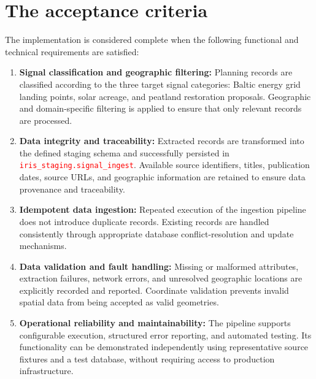 \documentclass[11pt,a4paper]{article}
\begin{document}
\section{The acceptance criteria}\label{sec:criteria}
%
The implementation is considered complete when the following
functional and technical requirements are satisfied:

\begin{enumerate}
	
	\item \textbf{Signal classification and geographic filtering:} 
	Planning records are classified according to the three target
	signal categories: Baltic energy grid landing points, solar
	acreage, and peatland restoration proposals. Geographic and
	domain-specific filtering is applied to ensure that only
	relevant records are processed.
	
	\item \textbf{Data integrity and traceability:} 
	Extracted records are transformed into the defined staging
	schema and successfully persisted in
	\textcolor{red}{\texttt{iris\_staging.signal\_ingest}}. Available source
	identifiers, titles, publication dates, source URLs, and
	geographic information are retained to ensure data
	provenance and traceability.
	
	\item \textbf{Idempotent data ingestion:} 
	Repeated execution of the ingestion pipeline does not
	introduce duplicate records. Existing records are handled
	consistently through appropriate database conflict-resolution
	and update mechanisms.
	
	\item \textbf{Data validation and fault handling:} 
	Missing or malformed attributes, extraction failures,
	network errors, and unresolved geographic locations are
	explicitly recorded and reported. Coordinate validation
	prevents invalid spatial data from being accepted as valid
	geometries.
	
	\item \textbf{Operational reliability and maintainability:} 
	The pipeline supports configurable execution, structured
	error reporting, and automated testing. Its functionality
	can be demonstrated independently using representative
	source fixtures and a test database, without requiring
	access to production infrastructure.
	
\end{enumerate}
\end{document}
